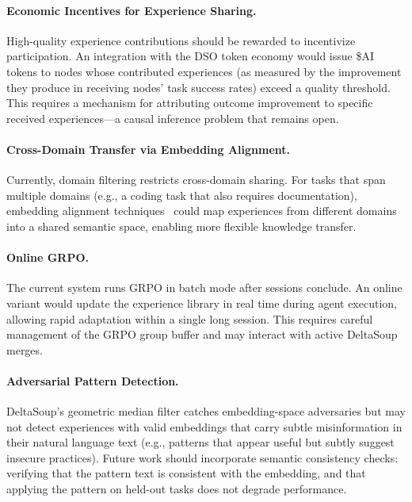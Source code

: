 \documentclass[11pt]{article}
\begin{document}
\paragraph{Economic Incentives for Experience Sharing.}
High-quality experience contributions should be rewarded to incentivize
participation. An integration with the DSO token economy would issue \$AI
tokens to nodes whose contributed experiences (as measured by the improvement
they produce in receiving nodes' task success rates) exceed a quality
threshold. This requires a mechanism for attributing outcome improvement to
specific received experiences---a causal inference problem that remains open.

\paragraph{Cross-Domain Transfer via Embedding Alignment.}
Currently, domain filtering restricts cross-domain sharing. For tasks that
span multiple domains (e.g., a coding task that also requires documentation),
embedding alignment techniques~\cite{conneau2020unsupervised} could map
experiences from different domains into a shared semantic space, enabling
more flexible knowledge transfer.

\paragraph{Online GRPO.}
The current system runs GRPO in batch mode after sessions conclude. An
online variant would update the experience library in real time during
agent execution, allowing rapid adaptation within a single long session.
This requires careful management of the GRPO group buffer and may interact
with active DeltaSoup merges.

\paragraph{Adversarial Pattern Detection.}
DeltaSoup's geometric median filter catches embedding-space adversaries
but may not detect experiences with valid embeddings that carry subtle
misinformation in their natural language text (e.g., patterns that appear
useful but subtly suggest insecure practices). Future work should incorporate
semantic consistency checks: verifying that the pattern text is consistent
with the embedding, and that applying the pattern on held-out tasks does not
degrade performance.

\end{document}

